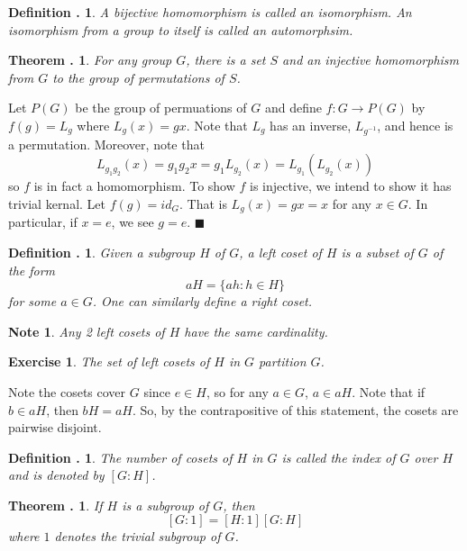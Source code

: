 \documentclass[twoside]{report}
\newcommand{\done}{$\blacksquare$}
\newcounter{Lecture}
\theoremstyle{myts}
\newcounter{c}[Lecture]
\newtheorem{dfn}[c]{Definition \arabic{Lecture}.}
\newtheorem{thm}[c]{Theorem \arabic{Lecture}.}
\newtheorem*{nte}{Note}
\newcounter{ex}[Lecture]
\newtheorem{exc}[ex]{Exercise }
\newenvironment{prf}{
  \noindent\begin{mdframed}[style=prf]}{\end{mdframed} \vspace{1em}
}
\begin{document}
\begin{dfn}
  A bijective homomorphism is called an \emph{isomorphism}. An isomorphism from a group to itself is called an \emph{automorphsim}.
\end{dfn}

\begin{thm}
  For any group $G$, there is a set $S$ and an injective homomorphism from $G$ to the group of permutations of $S$.
\end{thm}

\begin{prf}
  Let $P(G)$ be the group of permuations of $G$ and define $f:G\to P(G)$ by $f(g)=L_g$ where $L_g(x)=gx$. Note that $L_g$ has an inverse, $L_{g^{-1}}$, and hence is a permutation. Moreover, note that
  \[
    L_{g_1g_2}(x) = g_1g_2x = g_1L_{g_2}(x) = L_{g_1}(L_{g_2}(x))
  \]
  so $f$ is in fact a homomorphism. To show $f$ is injective, we intend to show it has trivial kernal. Let $f(g)=id_G$. That is $L_g(x)=gx=x$ for any $x\in G$. In particular, if $x=e$, we see $g=e$. \done
\end{prf}

\begin{dfn}
  Given a subgroup $H$ of $G$, a \emph{left coset} of $H$ is a subset of $G$ of the form
  \[
    aH = \{ ah : h\in H  \}
  \]
  for some $a\in G$. One can similarly define a \emph{right coset}.
\end{dfn}

\begin{nte}
  Any 2 left cosets of $H$ have the same cardinality.
\end{nte}

\begin{exc}
  The set of left cosets of $H$ in $G$ partition $G$.
\end{exc}

\begin{prf}
  Note the cosets cover $G$ since $e\in H$, so for any $a\in G$, $a\in aH$. Note that if $b\in aH$, then $bH=aH$. So, by the contrapositive of this statement, the cosets are pairwise disjoint.
\end{prf}

\begin{dfn}
  The number of cosets of $H$ in $G$ is called the \emph{index} of $G$ over $H$ and is denoted by $[G:H]$.
\end{dfn}

\begin{thm}
  If $H$ is a subgroup of $G$, then
  \[
    [G:1] = [H:1][G:H]
  \]
  where $1$ denotes the trivial subgroup of $G$.
\end{thm}
\end{document}
